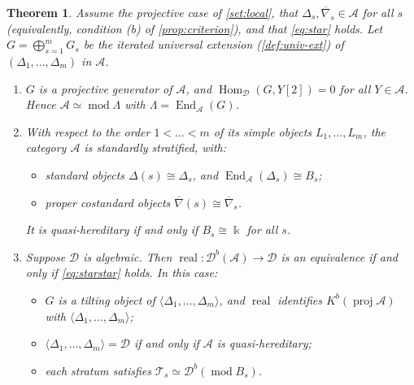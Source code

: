 \documentclass[11pt,reqno]{amsart}
\theoremstyle{plain}
\newtheorem{theorem}{Theorem}[section]
\theoremstyle{definition}
\theoremstyle{remark}
\newcommand{\kk}{\Bbbk}
\DeclareMathOperator{\Hom}{Hom}
\DeclareMathOperator{\End}{End}
\DeclareMathOperator{\real}{real}
\newcommand{\modd}{\operatorname{mod}}
\newcommand{\proj}{\operatorname{proj}}
\newcommand{\Db}{\mathcal{D}^b}
\newcommand{\Kb}{K^b}
\newcommand{\thick}[1]{\langle #1\rangle}
\newcommand{\nablabar}{\overline{\nabla}}
\newcommand{\cD}{\mathcal{D}}
\newcommand{\cA}{\mathcal{A}}
\newcommand{\cT}{\mathcal{T}}
\begin{document}
\begin{theorem}\label{thm:A}
Assume the projective case of \cref{set:local}, that $\Delta_s,\nablabar_s\in\cA$ for all $s$ (equivalently, condition \textup{(b)} of \cref{prop:criterion}), and that \eqref{eq:star} holds. Let $G=\bigoplus_{s=1}^mG_s$ be the iterated universal extension (\cref{def:univ-ext}) of $(\Delta_1,\dots,\Delta_m)$ in $\cA$.
\begin{enumerate}
\item $G$ is a projective generator of $\cA$, and $\Hom_\cD(G,Y[2])=0$ for all $Y\in\cA$. Hence $\cA\simeq\modd\Lambda$ with $\Lambda=\End_\cA(G)$.
\item With respect to the order $1<\dots<m$ of its simple objects $L_1,\dots,L_m$, the category $\cA$ is standardly stratified, with:
\begin{itemize}
\item standard objects $\Delta(s)\cong\Delta_s$, and $\End_\cA(\Delta_s)\cong B_s$;
\item proper costandard objects $\nablabar(s)\cong\nablabar_s$.
\end{itemize}
It is quasi-hereditary if and only if $B_s\cong\kk$ for all $s$.
\item Suppose $\cD$ is algebraic. Then $\real\colon\Db(\cA)\to\cD$ is an equivalence if and only if \eqref{eq:starstar} holds. In this case:
\begin{itemize}
\item $G$ is a tilting object of $\thick{\Delta_1,\dots,\Delta_m}$, and $\real$ identifies $\Kb(\proj\cA)$ with $\thick{\Delta_1,\dots,\Delta_m}$;
\item $\thick{\Delta_1,\dots,\Delta_m}=\cD$ if and only if $\cA$ is quasi-hereditary;
\item each stratum satisfies $\cT_s\simeq\Db(\modd B_s)$.
\end{itemize}
\end{enumerate}
\end{theorem}
\end{document}
